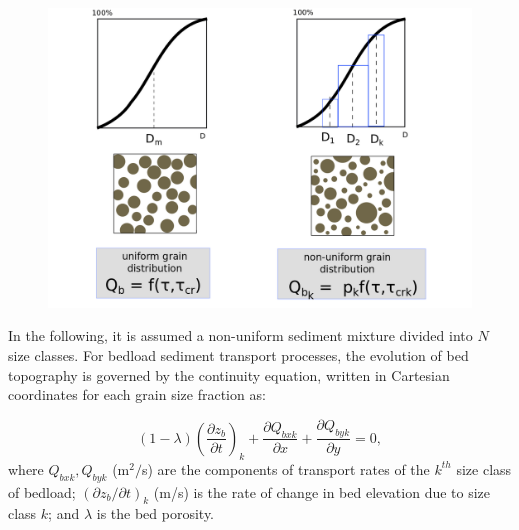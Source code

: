 \begin{figure}[H]%
\begin{center}
\includegraphics[scale=0.3]{./graphics/graded.png}
\end{center}
\end{figure}

\noindent
In the following, it is assumed a non-uniform sediment mixture divided into $N$ size classes. For bedload sediment transport processes, the evolution of bed topography is governed by the continuity equation, written in Cartesian coordinates for each grain size fraction as:

\begin{equation}
(1-\lambda)\left(\frac{\partial z_b}{\partial t}\right)_k+\frac{\partial Q_{bxk}}{\partial x}+\frac{\partial Q_{byk}}{\partial y} = 0,
\end{equation}
 where $Q_{bxk}, Q_{byk}$ (m$^2/$s) are the components of transport rates of the $k^{th}$ size class of bedload; $(\partial z_b/\partial t)_k$ (m/s) is the rate of change in bed elevation due to size class $k$; and $\lambda$ is the bed porosity.

